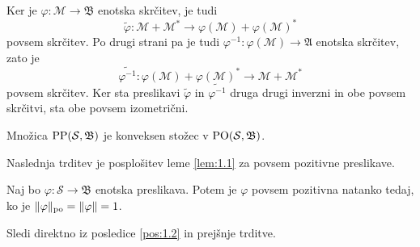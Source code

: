 \begin{dokaz}
    Ker je $\varphi: \mathcal{M} \to \mathfrak{B}$ enotska skrčitev, je tudi 
    $$\tilde{\varphi}: \mathcal{M} + \mathcal{M}^* \to \varphi(\mathcal{M}) + \varphi(\mathcal{M})^*$$
    povsem skrčitev. Po drugi strani pa je tudi 
    $\varphi^{-1}: \varphi(\mathcal{M}) \to \mathfrak{A}$ enotska skrčitev, zato je
    $$\widetilde{\varphi^{-1}}: \varphi(\mathcal{M}) + \varphi(\mathcal{M})^* \to \mathcal{M} + \mathcal{M}^*$$
    povsem skrčitev. Ker sta preslikavi $\tilde{\varphi}$ in $\widetilde{\varphi^{-1}}$
    druga drugi inverzni in obe povsem skrčitvi, sta obe povsem izometrični.
\end{dokaz}

\begin{posledica}
    Množica $\operatorname{PP} (\mathcal{S}, \mathfrak{B})$ je konveksen stožec v $\operatorname{PO} (\mathcal{S}, \mathfrak{B})$.
\end{posledica}

Naslednja trditev je posplošitev leme \ref{lem:1.1} za povsem pozitivne preslikave.

\begin{posledica}
    Naj bo $\varphi: \mathcal{S} \to \mathfrak{B}$ enotska preslikava.
    Potem je $\varphi$ povsem pozitivna natanko tedaj, ko je $\| \varphi \|_{\operatorname{po}} = \| \varphi\| = 1$.
\end{posledica}

\begin{dokaz}
    Sledi direktno iz posledice \ref{pos:1.2} in prejšnje trditve.
\end{dokaz}

